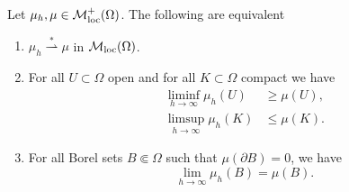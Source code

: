 \begin{theorem}
Let $\mu_h, \mu \in \mathcal{M}^{+}_{\rm loc}(\Omega)$. The following are equivalent
\begin{enumerate}[(1)]
\item $\mu_h \stackrel {*}{\rightharpoonup} \mu$ in $\mathcal{M}_{\rm loc}(\Omega)$. 
\item For all $U \subset \Omega$ open and for all $K \subset \Omega$ compact we have 
\begin{align} \label{eq:liminf_ineq_open}
\liminf _{h\to \infty} \mu_h(U) & \geq \mu(U), \\
\limsup_{h \to \infty} \mu_h(K) & \leq \mu(K). \label{eq:limsup_ineq_compact}
\end{align} 
\item For all Borel sets $B\Subset \Omega$ such that $\mu(\partial B) = 0$, we
have 
\begin{equation} \label{eq:limit_Borel_no_boundary} 
\lim_{h\to \infty} \mu_h(B) = \mu(B).
\end{equation}
\end{enumerate}
\end{theorem}
